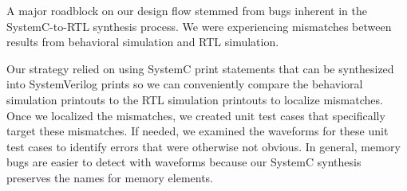 
A major roadblock on our design flow stemmed from bugs inherent in the
SystemC-to-RTL synthesis process. We were experiencing mismatches between
results from behavioral simulation and RTL simulation.

Our strategy relied on using SystemC print statements that can be
synthesized into SystemVerilog prints so we can conveniently compare the
behavioral simulation printouts to the RTL simulation printouts to
localize mismatches. Once we localized the mismatches, we created unit
test cases that specifically target these mismatches. If needed, we
examined the waveforms for these unit test cases to identify errors that
were otherwise not obvious. In general, memory bugs are easier to detect
with waveforms because our SystemC synthesis preserves the names for
memory elements.


